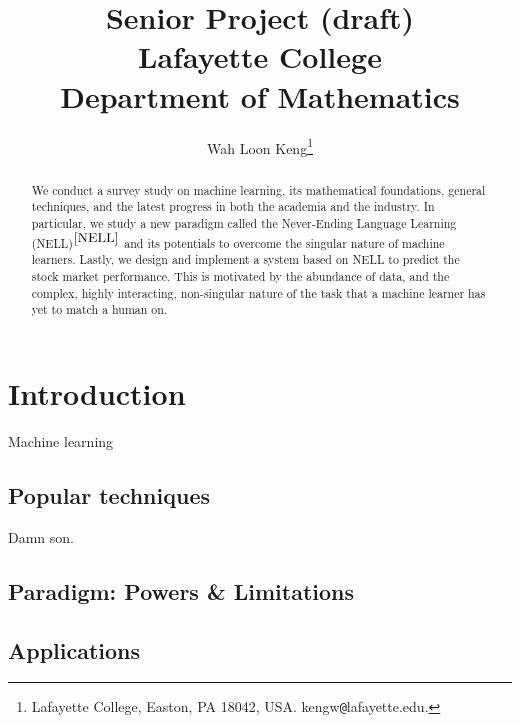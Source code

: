 \documentclass[12pt]{article}  %
\begin{document}
\title{Senior Project (draft)\\
Lafayette College \\
Department of Mathematics
}

\author{
{Wah Loon Keng}\thanks{
Lafayette College,
Easton, PA 18042, USA.
kengw{\tt @}lafayette.edu.}
}
\maketitle


\begin{abstract}
We conduct a survey study on machine learning, its mathematical foundations, general techniques, and the latest progress in both the academia and the industry. In particular, we study a new paradigm called the Never-Ending Language Learning (NELL)$^{\ref{NELL}}$ and its potentials to overcome the singular nature of machine learners. Lastly, we design and implement a system based on NELL to predict the stock market performance. This is motivated by the abundance of data, and the complex, highly interacting, non-singular nature of the task that a machine learner has yet to match a human on.
\end{abstract}



\clearpage
\tableofcontents
\clearpage



\section{Introduction} \label{intro}

Machine learning 


\subsection{Popular techniques}
Damn son.

\subsection{Paradigm: Powers \& Limitations}
\subsection{Applications}
\end{document}

